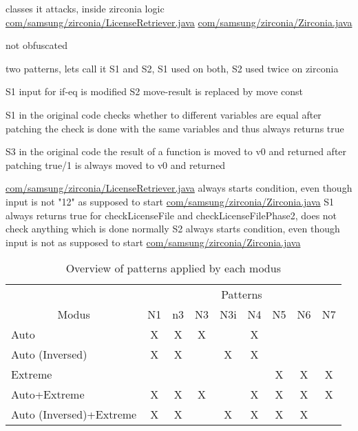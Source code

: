 classes it attacks, inside zirconia logic
\url{com/samsung/zirconia/LicenseRetriever.java}
\url{com/samsung/zirconia/Zirconia.java}

not obfuscated

two patterns, lets call it S1 and S2, S1 used on both, S2 used twice on zirconia



S1
input for if-eq is modified
S2
move-result is replaced by move const


S1
in the original code checks whether to different variables are equal
after patching the check is done with the same variables and thus always returns true

S3
in the original code the result of a function is moved to v0 and returned
after patching true/1 is always moved to v0 and returned



\url{com/samsung/zirconia/LicenseRetriever.java}
always starts condition, even though input is not "12" as supposed to start
\url{com/samsung/zirconia/Zirconia.java}
S1
always returns true for checkLicenseFile and checkLicenseFilePhase2, does not check anything which is done normally
S2
always starts condition, even though input is not as supposed to start
\url{com/samsung/zirconia/Zirconia.java}
\begin{table}[h]
\centering
\begin{tabular}{l|cccccccc}
                           & \multicolumn{8}{c}{Patterns}           \\
\multicolumn{1}{c|}{Modus} & N1 & n3 & N3 & N3i & N4 & N5 & N6 & N7 \\ \hline
Auto                       & X  & X  & X  &     & X  &    &    &    \\
Auto (Inversed)            & X  & X  &    & X   & X  &    &    &    \\
Extreme                    &    &    &    &     &    & X  & X  & X  \\
Auto+Extreme               & X  & X  & X  &     & X  & X  & X  & X  \\
Auto (Inversed)+Extreme    & X  & X  &    & X   & X  & X  & X  &
\end{tabular}
\caption{Overview of patterns applied by each modus}
\label{table:patterns}
\end{table}



